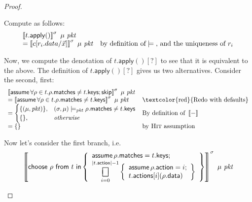 \documentclass{article}
\newcommand{\pkt}{\mathit{pkt}}
\newcommand{\denote}[1]{\left\llbracket#1\right\rrbracket}
\newcommand{\matches}{\mathsf{matches}}
\newcommand{\action}{\mathsf{action}}
\newcommand{\actions}{\mathsf{actions}}
\newcommand{\keys}{\mathsf{keys}}
\newcommand{\data}{\mathsf{data}}
\newcommand{\assume}{\mathop{\mathsf{assume}}}
\newcommand{\apply}{\mathsf{apply}}
\newcommand{\choiceop}{\rotatebox[origin=c]{90}{$\sqsubset\!\!\!\sqsupset$}}
\DeclareMathOperator*{\bigchoice}{\scalerel*{\choiceop}{\sum}}
\renewcommand{\choose}[2]{\mathop{\mathsf{choose}~#1~\mathsf{from}~#2~\mathsf{in}}}
\newcommand{\SKIP}{\mathsf{skip}}
\newcommand{\satisfy}[3]{({#1,#3}) \models_{#2}}
\begin{document}
\begin{proof}
\begin{enumerate}[align=left]
\begin{enumerate}
      Compute as follows:
      \[\begin{array}{>{\displaystyle}ll}
      \denote{t.\apply()}^\sigma~\mu~\pkt \\
      = \denote{c[r_i.data/\vec x]}^\sigma~\mu~\pkt & \text{by definition of} \models \text{, and the uniqueness of }r_i  \\
      \end{array}
      \]

      Now, we compute the denotation of $t.\apply()[?]$ to see that it is equivalent to the above.
      The definition of $t.\apply()[?]$ gives us two alternatives. Consider the second, first:
      \[\begin{array}{>{\displaystyle}ll}
        \denote{\assume \forall \rho \in t. \rho.\matches \neq t.\keys;\SKIP}^\sigma~\mu~\pkt \\
        = \denote{\assume \forall \rho \in t. \rho.\matches \neq t.\keys}^\sigma~\mu~\pkt
        & \textrm{\textcolor{red}{Redo with defaults}} \\
        = \begin{cases}
          \{(\mu,\pkt)\}, & \satisfy\sigma\pkt\mu \rho.\matches \neq t.\keys \\
          \{\}, &\textit{otherwise}
        \end{cases}
        & \textrm{By definition of }\denote{-}\\
        =  \{\}
        & \textrm{by \textsc{Hit} assumption}
      \end{array}
      \]

      Now let's consider the first branch, i.e.
      \[
      \denote{\choose \rho t \left\{
        \begin{array}{>{\displaystyle}l}
          \assume \rho.\matches = t.\keys;\\
          \bigchoice_{i=0}^{|t.\action| -1}
          \left\{\begin{array}{l}
          \assume \rho.\action = i;\\
          t.\actions[i](\rho.\data)
          \end{array}\right\}
        \end{array}\right\}
      }^\sigma~\mu~\pkt\]


\end{enumerate}
\end{enumerate}
\end{proof}
\end{document}
